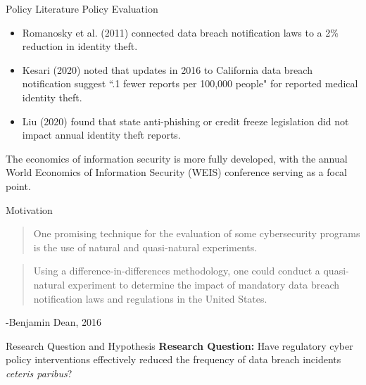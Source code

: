 \documentclass[10pt]{beamer}
\begin{document}
\begin{frame}{Policy Literature}
Policy Evaluation
\begin{itemize}
    \item Romanosky et al. (2011) connected data breach notification laws to a 2\% reduction in identity theft. \cite{Romanoskydatabreachdisclosure2011a}
    \item Kesari (2020) noted that updates in 2016 to California data breach notification suggest ``.1 fewer reports per 100,000 people" for reported medical identity theft. \cite{KesariEffectStateData2020}
    \item  Liu (2020) found that state anti-phishing or credit freeze legislation did not impact annual identity theft reports. \cite{Liueffectstatecharacteristics2020}
\end{itemize}
The economics of information security is more fully developed, with the annual World Economics of Information Security (WEIS) conference serving as a focal point.

\end{frame}

\begin{frame}{Motivation}
\begin{quote}
One promising technique for the evaluation of some cybersecurity programs is the use of natural and quasi-natural experiments.
\end{quote}
\begin{quote}
Using a difference-in-differences methodology, one could conduct a quasi-natural experiment to determine the impact of mandatory data breach notification laws and regulations in the United States.
\end{quote}
\begin{flushright}
 -Benjamin Dean, 2016 \cite{BenjaminDeanNaturalQuasiNaturalExperiments}
\end{flushright}
\end{frame}

\begin{frame}{Research Question and Hypothesis}
\textbf{Research Question:} Have regulatory cyber policy interventions effectively reduced the frequency of data breach incidents \textit{ceteris paribus}? \\
\end{frame}
\end{document}

